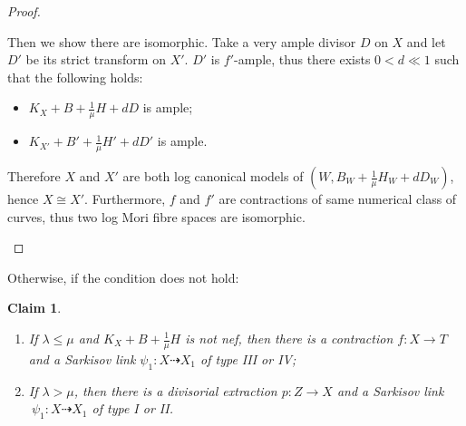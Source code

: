 \documentclass[11pt]{amsart}
\numberwithin{equation}{section}
\newtheorem{claim}[defn]{Claim}
\begin{document}
\begin{proof}
\begin{enumerate}
Then we show there are isomorphic. Take a very ample divisor $ D $ on $ X $ and let $ D'  $ be its strict transform on $ X' $. $ D' $ is $ f' $-ample, thus there exists $ 0<d\ll1 $ such that the following holds:
      \begin{itemize}
        \item $ K_X+B+\frac{1}{\mu }H+dD $ is ample;
        \item $ K_{X'}+B'+\frac{1}{\mu }H'+dD' $ is ample.
      \end{itemize}
  Therefore $X$ and $X'$ are both log canonical models of $(W,B_{W}+\frac{1}{\mu}H_{W}+dD_{W})$, hence $X\cong X'$. Furthermore, $f$ and  $f'$ are contractions of same numerical class of curves, thus two log Mori fibre spaces are isomorphic.
\end{enumerate}
\end{proof}
Otherwise, if the condition does not hold:
\begin{claim}
  \begin{enumerate}
  \item If $ \lambda\leqslant\mu $ and $ K_X+B+\frac{1}{\mu}H $ is not nef, then there is a contraction $f:X \to T$ and a Sarkisov link $\psi_{1}:X\dashrightarrow X_{1}$ of type III or IV;
    \item  If $ \lambda>\mu $, then there is a divisorial extraction $p:Z\to X$ and a Sarkisov link $\
     \psi_{1}:X\dashrightarrow X_{1}$ of type I or II.
\end{enumerate} 
\end{claim}
\end{document}

